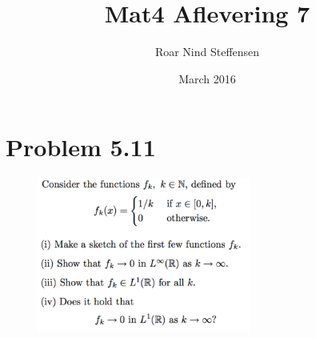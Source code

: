 \documentclass{article}
\title{Mat4 Aflevering 7}
\author{Roar Nind Steffensen}
\date{March 2016}
\begin{document}
\maketitle
\section*{Problem 5.11}

\begin{figure}[H]
    \centering
    \includegraphics[width=7cm]{fig/prob511}
\end{figure}
\end{document}
